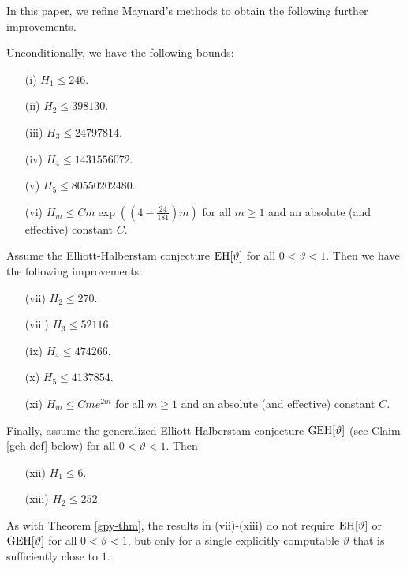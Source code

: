 In this paper, we refine Maynard's methods to obtain the following further improvements.

\begin{theorem}\label{main} Unconditionally, we have the following bounds:
\begin{itemize}
\item[(i)] $H_1 \leq 246$.   
\item[(ii)] $H_2 \leq \num{398130}$. 
\item[(iii)] $H_3 \leq \num{24797814}$. 
\item[(iv)] $H_4 \leq \num{1431556072}$.  
\item[(v)] $H_5 \leq \num{80550202480}$. 
\item[(vi)] $H_m \leq C m \exp( (4 - \frac{24}{181}) m )$ for all $m \geq 1$ and an absolute (and effective) constant $C$.
\end{itemize}
Assume the Elliott-Halberstam conjecture $\operatorname*{EH}[\vartheta]$ for all $0 < \vartheta < 1$.  Then we have the following improvements:
\begin{itemize}
\item[(vii)] $H_2 \leq 270$.
\item[(viii)] $H_3 \leq \num{52116}$.
\item[(ix)] $H_4 \leq \num{474266}$.
\item[(x)] $H_5 \leq \num{4137854}$.
\item[(xi)] $H_m \leq Cme^{2m}$ for all $m \geq 1$ and an absolute (and effective) constant $C$.
\end{itemize}
Finally, assume the generalized Elliott-Halberstam conjecture $\operatorname*{GEH}[\vartheta]$ (see Claim \ref{geh-def} below) for all $0 < \vartheta < 1$.  Then
\begin{itemize}
\item[(xii)] $H_1 \leq 6$.
\item[(xiii)] $H_2 \leq 252$.
\end{itemize}
\end{theorem}

As with Theorem \ref{gpy-thm}, the results in (vii)-(xiii) do not require $\operatorname*{EH}[\vartheta]$ or $\operatorname*{GEH}[\vartheta]$ for all $0 < \vartheta < 1$, but only for a single explicitly computable $\vartheta$ that is sufficiently close to $1$.

